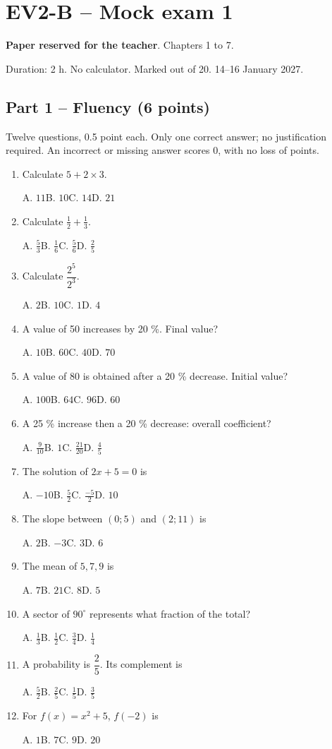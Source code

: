 \clearpage\section*{EV2-B -- Mock exam 1}\label{EV2-B}
\textbf{Paper reserved for the teacher}. Chapters 1 to 7.\par Duration: 2 h. No calculator. Marked out of 20. 14--16 January 2027.
\subsection*{Part 1 -- Fluency (6 points)}
Twelve questions, 0.5 point each. Only one correct answer; no justification required. An incorrect or missing answer scores 0, with no loss of points.
\begin{enumerate}
\item Calculate $5+2\times3$.\par A. $11$\quad B. $10$\quad C. $14$\quad D. $21$
\item Calculate $\frac12+\frac13$.\par A. $\frac{5}{3}$\quad B. $\frac{1}{6}$\quad C. $\frac{5}{6}$\quad D. $\frac{2}{5}$
\item Calculate $\dfrac{2^5}{2^{3}}$.\par A. $2$\quad B. $10$\quad C. $1$\quad D. $4$
\item A value of 50 increases by 20 \%. Final value?\par A. $10$\quad B. $60$\quad C. $40$\quad D. $70$
\item A value of 80 is obtained after a 20 \% decrease. Initial value?\par A. $100$\quad B. $64$\quad C. $96$\quad D. $60$
\item A 25 \% increase then a 20 \% decrease: overall coefficient?\par A. $\frac{9}{10}$\quad B. $1$\quad C. $\frac{21}{20}$\quad D. $\frac{4}{5}$
\item The solution of $2x+5=0$ is\par A. $-10$\quad B. $\frac{5}{2}$\quad C. $\frac{-5}{2}$\quad D. $10$
\item The slope between $(0;5)$ and $(2;11)$ is\par A. $2$\quad B. $-3$\quad C. $3$\quad D. $6$
\item The mean of $5, 7, 9$ is\par A. $7$\quad B. $21$\quad C. $8$\quad D. $5$
\item A sector of $90^\circ$ represents what fraction of the total?\par A. $\frac{1}{3}$\quad B. $\frac{1}{2}$\quad C. $\frac{3}{4}$\quad D. $\frac{1}{4}$
\item A probability is $\dfrac{2}{5}$. Its complement is\par A. $\frac{5}{2}$\quad B. $\frac{2}{5}$\quad C. $\frac{1}{5}$\quad D. $\frac{3}{5}$
\item For $f(x)=x^2+5$, $f(-2)$ is\par A. $1$\quad B. $7$\quad C. $9$\quad D. $20$
\end{enumerate}
